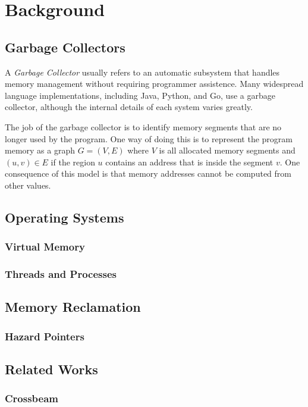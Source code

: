 \chapter{Background}

\section{Garbage Collectors}

A \emph{Garbage Collector} usually refers to an automatic subsystem that handles memory management
without requiring programmer assistence. Many widespread language implementations,
including Java, Python, and Go, use a garbage collector, although the internal details of each
system varies greatly.

The job of the garbage collector is to identify memory segments that are no longer used by the
program. One way of doing this is to represent the program memory as a graph $G=(V, E)$ where $V$ is
all allocated memory segments and $(u, v) \in E$ if the region $u$ contains an address that is
inside the segment $v$. One consequence of this model is that memory addresses cannot be computed
from other values.

\section{Operating Systems}

\todo{}

\subsection{Virtual Memory}

\todo{}

\subsection{Threads and Processes}

\todo{}

\section{Memory Reclamation}

\subsection{Hazard Pointers\label{sec:hazard-pointers}}

\section{Related Works}

\subsection{Crossbeam}
